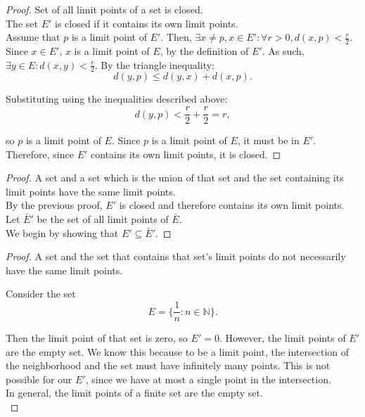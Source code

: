 \documentclass[10pt]{article}
\theoremstyle{definition}
\theoremstyle{plain}
\newcommand{\N}{\mathbb{N}}
\begin{document}
\begin{proof}
Set of all limit points of a set is closed. \\

The set $E'$ is closed if it contains its own limit points. \\

Assume that $p$ is a limit point of $E'$. Then, $\exists x\neq p, x\in E': \forall r>0, d(x,p) < \frac{r}{2}$. \\

Since $x\in E'$, $x$ is a limit point of $E$, by the definition of $E'$. As such, $\exists y\in E: d(x,y) < \frac{r}{2}$. By the triangle inequality:
$$d(y,p) \leq d(y,x) + d(x,p).$$

Substituting using the inequalities described above:
$$d(y,p) < \frac{r}{2}+\frac{r}{2} =r,$$

so $p$ is a limit point of $E$. Since $p$ is a limit point of $E$, it must be in $E'$. Therefore, since $E'$ contains its own limit points, it is closed.
\end{proof}

\begin{proof}
A set and a set which is the union of that set and the set containing its limit points have the same limit points. \\

By the previous proof, $E'$ is closed and therefore contains its own limit points. \\

Let $\bar{E}'$ be the set of all limit points of $\bar{E}$. \\

We begin by showing that $E'\subseteq \bar{E}'$.

\end{proof}

\begin{proof}
  A set and the set that contains that set's limit points do not necessarily have the same limit points.

  Consider the set
  $$E = \{\frac{1}{n}: n\in\N\}.$$

  Then the limit point of that set is zero, so $E' = {0}$. However, the limit points of $E'$ are the empty set. We know this because to be a limit point, the intersection of the neighborhood and the set must have infinitely many points. This is not possible for our $E'$, since we have at most a single point in the intersection. \\

  In general, the limit points of a finite set are the empty set. \\
\end{proof}
\end{document}

